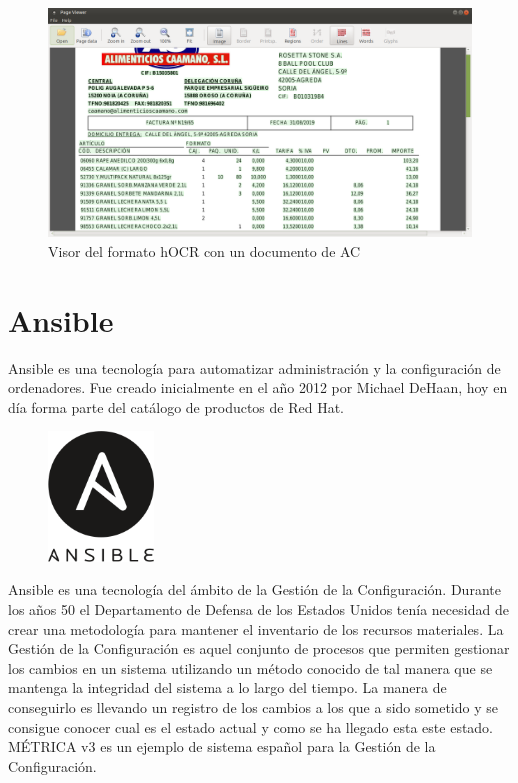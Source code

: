 \begin{figure}[hp!]
    \centering
    \includegraphics[width=1.0\textwidth]{imaxes/z-adicional/visor-hocr.png}
    \caption{Visor del formato hOCR con un documento de AC}
    \label{fig:visor-formato-hocr}
\end{figure}

\section{Ansible}


Ansible es una tecnología para automatizar administración y la configuración de ordenadores. Fue creado inicialmente en el año 2012 por Michael DeHaan, hoy en día forma parte del catálogo de productos de Red Hat.

\begin{figure}
    \centering
    \includegraphics[width=0.25\textwidth]{imaxes/e-fundamentos-tecnologicos/logo-ansible.png}
\end{figure}

Ansible es una tecnología del ámbito de la Gestión de la Configuración. Durante los años 50 el Departamento de Defensa de los Estados Unidos tenía necesidad de crear una metodología para mantener el inventario de los recursos materiales. La Gestión de la Configuración es aquel conjunto de procesos que permiten gestionar los cambios en un sistema utilizando un método conocido de tal manera que se mantenga la integridad del sistema a lo largo del tiempo. La manera de conseguirlo es llevando un registro de los cambios a los que a sido sometido y se consigue conocer cual es el estado actual y como se ha llegado esta este estado. MÉTRICA v3 es un ejemplo de sistema español para la Gestión de la Configuración.

